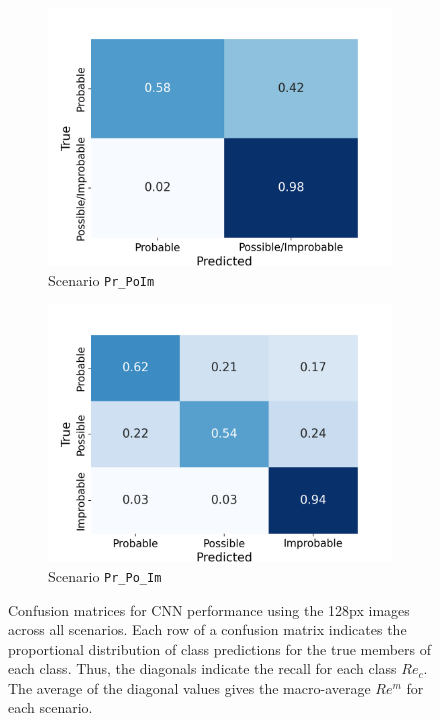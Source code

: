 \documentclass[Journal,letterpaper, SingleSpace, InsideFigs]{ascelike-new}
\begin{document}
\begin{figure}[ht]
  \begin{subfigure}[t]{.4\linewidth}
    \centering
    \includegraphics[width=\linewidth, trim={0 0 1cm 1cm}, clip]{opt-confusion-matrix-Pr_PoIm-128-px.png}
    \caption{Scenario \texttt{Pr\_PoIm}}
    \label{pr_poim_cm}
\end{subfigure}%
  \begin{subfigure}[t]{.4\linewidth}
    \centering
    \includegraphics[width=\linewidth, trim={0 0 1cm 1cm}, clip]{opt-confusion-matrix-Pr_Po_Im-128-px.png}
    \caption{Scenario \texttt{Pr\_Po\_Im}}
    \label{pr_po_im_cm}
  \end{subfigure}%
    \caption{Confusion matrices for CNN performance using the 128px images across all scenarios.
    Each row of a confusion matrix indicates the proportional distribution of class predictions for the true members of each class. Thus, the diagonals indicate the recall for each class $Re_c$. The average of the diagonal values gives the macro-average $Re^m$ for each scenario.}
    \label{fig:confusion-matrix}
  \end{figure}
\end{document}
